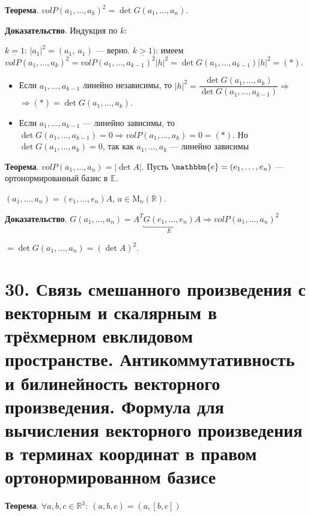 \documentclass[a4paper, 12pt]{article}
\newcommand{\E}{\mathbb{E}}
\newcommand{\R}{\mathbb{R}}
\newcommand{\me}{\mathbbm{e}}
\begin{document}
\textbf{Теорема}. $volP(a_1, \ldots, a_k)^2 = \det G(a_1, \ldots, a_n)$.

\textbf{Доказательство}. Индукция по $k$:

$\underline{k = 1}$: $|a_1|^2 = (a_1,\ a_1)$ --- верно.
$\underline{k > 1})$: имеем $volP(a_1, \ldots, a_k)^2 = volP(a_1, \ldots, a_{k - 1})^2|h|^2 = \det G(a_1, \ldots, a_{k - 1})|h|^2 = (*)$.
\vspace{-3mm}
\begin{itemize}
\itemsep=0em
\item Если $a_1, \ldots, a_{k - 1}$ линейно независимы, то $|h|^2 = \dfrac{\det G(a_1, \ldots, a_k)}{\det G(a_1, \ldots, a_{k - 1})} \Rightarrow$ \\
$\Rightarrow (*) = \det G(a_1, \ldots, a_k)$.
\item Если $a_1, \ldots, a_{k - 1}$ --- линейно зависимы, то $\det G(a_1, \ldots, a_{k - 1}) = 0 \Rightarrow volP(a_1, \ldots, a_k) = 0 = (*)$. Но $\det G(a_1, \ldots, a_k) = 0$, так как $a_1, \ldots, a_k$ --- линейно зависимы
\end{itemize}

\vspace{5mm}
\textbf{Теорема}. $volP(a_1, \ldots, a_n) = |\det A|$.
Пусть $\me = (e_1, \ldots, e_n)$ --- ортонормированный базис в $\E$.

$(a_1, \ldots, a_n) = (e_1, \ldots, e_n) A$, $a \in \text{M}_n(\R)$.

\textbf{Доказательство}. $G(a_1, \ldots, a_n) = A^T \underbracket{G(e_1, \ldots, e_n)}_{E}A \Rightarrow volP(a_1, \ldots, a_n)^2$

$= \det G(a_1, \ldots, a_n) = (\det A)^2$.

\section*{30. Связь смешанного произведения с векторным и скалярным в трёхмерном евклидовом пространстве. Антикоммутативность и билинейность векторного произведения. Формула для вычисления векторного произведения в терминах координат в правом ортонормированном базисе}
\textbf{Теорема}. $\forall a, b, c \in \R^3:\ (a, b, c) = (a, [b, c])$
\end{document}
